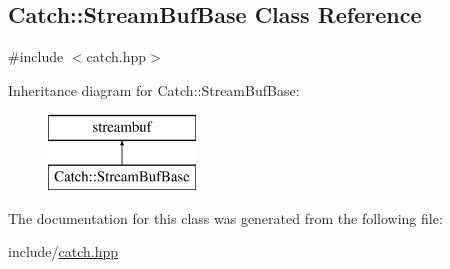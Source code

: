 \hypertarget{classCatch_1_1StreamBufBase}{\subsection{Catch\-:\-:Stream\-Buf\-Base Class Reference}
\label{classCatch_1_1StreamBufBase}
}


{\ttfamily \#include $<$catch.\-hpp$>$}

Inheritance diagram for Catch\-:\-:Stream\-Buf\-Base\-:\begin{figure}[H]
\begin{center}
\leavevmode
\includegraphics[height=2.000000cm]{classCatch_1_1StreamBufBase}
\end{center}
\end{figure}


The documentation for this class was generated from the following file\-:\begin{DoxyCompactItemize}
\item 
include/\hyperlink{catch_8hpp}{catch.\-hpp}\end{DoxyCompactItemize}
